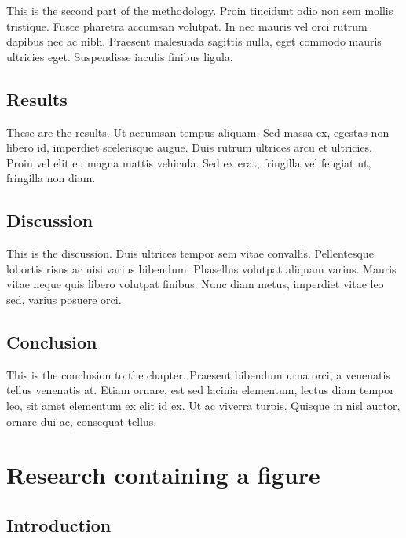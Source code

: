This is the second part of the methodology. Proin tincidunt odio non
sem mollis tristique. Fusce pharetra accumsan volutpat. In nec
mauris vel orci rutrum dapibus nec ac nibh. Praesent malesuada
sagittis nulla, eget commodo mauris ultricies eget. Suspendisse
iaculis finibus ligula.

\hypertarget{results}{%
\subsection{Results}\label{results}}

These are the results. Ut accumsan tempus aliquam. Sed massa ex,
egestas non libero id, imperdiet scelerisque augue. Duis rutrum
ultrices arcu et ultricies. Proin vel elit eu magna mattis vehicula.
Sed ex erat, fringilla vel feugiat ut, fringilla non diam.

\hypertarget{discussion}{%
\subsection{Discussion}\label{discussion}}

This is the discussion. Duis ultrices tempor sem vitae convallis.
Pellentesque lobortis risus ac nisi varius bibendum. Phasellus
volutpat aliquam varius. Mauris vitae neque quis libero volutpat
finibus. Nunc diam metus, imperdiet vitae leo sed, varius posuere
orci.

\hypertarget{conclusion}{%
\subsection{Conclusion}\label{conclusion}}

This is the conclusion to the chapter. Praesent bibendum urna orci,
a venenatis tellus venenatis at. Etiam ornare, est sed lacinia
elementum, lectus diam tempor leo, sit amet elementum ex elit id ex.
Ut ac viverra turpis. Quisque in nisl auctor, ornare dui ac,
consequat tellus.

\hypertarget{research-containing-a-figure}{%
\section{Research containing a
figure}\label{research-containing-a-figure}}

\hypertarget{introduction-1}{%
\subsection{Introduction}\label{introduction-1}}

